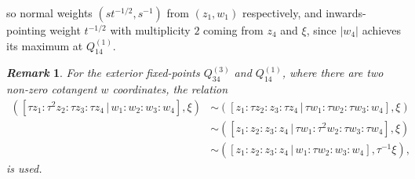 \documentclass{article}
\newtheorem{remark}{\it Remark\/}
\begin{document}
\begin{itemize}
		so normal weights $(st^{-1/2}, s^{-1})$ from $(z_{1}, w_{1})$ respectively, and inwards-pointing weight $t^{-1/2}$ with multiplicity $2$ coming from $z_{4}$ and $\xi$, since $|w_{4}|$ achieves its maximum at $Q_{14}^{(1)}$.
		
	\end{itemize}

	\begin{remark}
		For the exterior fixed-points $Q_{34}^{(3)}$ and $Q_{14}^{(1)}$, where there are two non-zero cotangent $w$ coordinates, the relation
		\begin{align*}
			\left( [\tau z_{1} : \tau^{2} z_{2} : \tau z_{3} : \tau z_{4} \, | \, w_{1} : w_{2} : w_{3} : w_{4}], \xi \right) &\sim	\left( [z_{1} : \tau z_{2} : z_{3} : \tau z_{4} \, | \, \tau w_{1} : \tau w_{2} : \tau w_{3} : w_{4}], \xi \right) \\ &\sim \left( [z_{1} : z_{2} : z_{3} : z_{4} \, | \, \tau w_{1} : \tau^{2} w_{2} : \tau w_{3} : \tau w_{4}], \xi \right) \\ &\sim \left( [z_{1} : z_{2} : z_{3} : z_{4} \, | \, w_{1} : \tau w_{2} : w_{3} : w_{4}], \tau^{-1} \xi \right),
		\end{align*}
		is used.
	\end{remark}
	

	
	
	
	
	
	
	
	
	
	
	
	
	
	
	
	
	
	
	
	
	
	
	  
	
	
\end{document}
